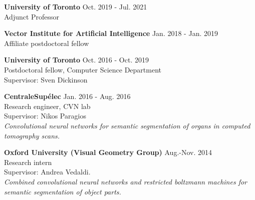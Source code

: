 \documentclass[margin]{res}
\begin{document}
\begin{resume}
\textbf{University of Toronto} \hfill Oct. 2019 - Jul. 2021\\
Adjunct Professor

\textbf{Vector Institute for Artificial Intelligence} \hfill Jan. 2018 - Jan. 2019\\
Affiliate postdoctoral fellow

\textbf{University of Toronto} \hfill Oct. 2016 - Oct. 2019\\
Postdoctoral fellow, Computer Science Department\\
Supervisor: Sven Dickinson

\textbf{CentraleSup\'elec} \hfill Jan. 2016 - Aug. 2016\\
Research engineer, CVN lab \\
Supervisor: Nikos Paragios \\
\emph{Convolutional neural networks for semantic 
	segmentation of organs in computed tomography scans.
}

\textbf{Oxford University (Visual Geometry Group)} \hfill Aug.-Nov. 2014\\
Research intern \\
Supervisor: Andrea Vedaldi. \\
\emph{Combined convolutional neural networks 
	and restricted boltzmann machines for semantic segmentation 
	of object parts.
}

\newpage

\end{resume}
\end{document}
